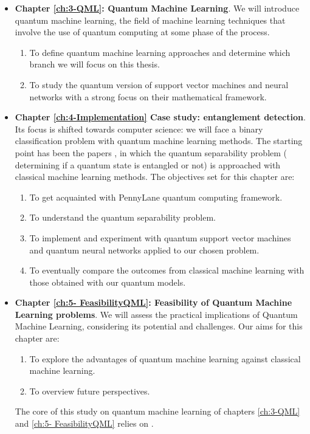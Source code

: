 \begin{itemize}
    \item \textbf{Chapter \ref{ch:3-QML}: Quantum Machine Learning}. We will introduce quantum machine learning, the field of machine learning techniques that involve the use of quantum computing at some phase of the process. 
    \begin{enumerate}[resume]
        \item To define quantum machine learning approaches and determine which branch we will focus on this thesis.
        \item To study the quantum version of support vector machines and neural networks with a strong focus on their mathematical framework.
    \end{enumerate}


    \item \textbf{Chapter \ref{ch:4-Implementation} Case study: entanglement detection}. Its focus is shifted towards computer science: we will face a binary classification problem with quantum machine learning methods. The starting point has been the papers \cite{casale2023large, urena2023entanglement}, in which the quantum separability problem ( determining if a quantum state is entangled or not) is approached with classical machine learning methods. The objectives set for this chapter are:
    \begin{enumerate}[resume]
        \item To get acquainted with PennyLane quantum computing framework.
        \item To understand the quantum separability problem. \cite{guhne2009entanglement}
        \item To implement and experiment with quantum support vector machines and quantum neural networks applied to our chosen problem.
        \item To eventually compare the outcomes from classical machine learning with those obtained with our quantum models.
    \end{enumerate}
    

    \item \textbf{Chapter \ref{ch:5- FeasibilityQML}: Feasibility of Quantum Machine Learning problems}. We will assess the practical implications of Quantum Machine Learning, considering its potential and challenges. Our aims for this chapter are:
    \begin{enumerate}[resume]
        \item To explore the advantages of quantum machine learning against classical machine learning.
        \item To overview future perspectives.
    \end{enumerate}
    The core of this study on quantum machine learning of chapters \ref{ch:3-QML} and \ref{ch:5- FeasibilityQML} relies on \cite{schuld2021machine, combarro2023practical}.
    
\end{itemize}



\endinput
